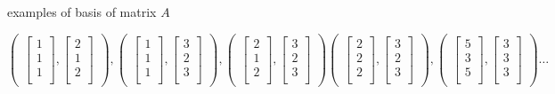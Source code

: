 \documentclass[a4paper,11pt]{article}
\numberwithin{equation}{section}
\begin{document}
\begin{itemize}
examples of basis of matrix $A$
\begin{center}
    \[ 
        \begin{pmatrix}
            \begin{bmatrix}  1\\1\\1\\\end{bmatrix},
            \begin{bmatrix}  2\\1\\2\\\end{bmatrix}
        \end{pmatrix},
        \begin{pmatrix}
            \begin{bmatrix}  1\\1\\1\\\end{bmatrix},
            \begin{bmatrix}  3\\2\\3\\\end{bmatrix}
        \end{pmatrix},
        \begin{pmatrix}
            \begin{bmatrix}  2\\1\\2\\\end{bmatrix},
            \begin{bmatrix}  3\\2\\3\\\end{bmatrix}
        \end{pmatrix}
        \begin{pmatrix}
            \begin{bmatrix}  2\\2\\2\\\end{bmatrix},
            \begin{bmatrix}  3\\2\\3\\\end{bmatrix}
        \end{pmatrix},
        \begin{pmatrix}
            \begin{bmatrix}  5\\3\\5\\\end{bmatrix},
            \begin{bmatrix}  3\\3\\3\\\end{bmatrix}
        \end{pmatrix}\dots
    \]
\end{center}


\end{itemize}
\end{document}
